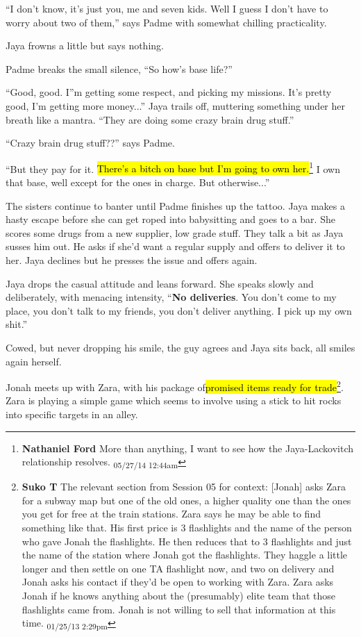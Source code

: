 ``I don't know, it's just you, me and seven kids.  Well I guess I don't have to worry about two of them,'' says Padme with somewhat chilling practicality.

Jaya frowns a little but says nothing.



Padme breaks the small silence, ``So how's base life?''

``Good, good.  I''m getting some respect, and picking my missions.  It's pretty good, I'm getting more money...'' Jaya trails off, muttering something under her breath like a mantra.  ``They are doing some crazy brain drug stuff.''

``Crazy brain drug stuff??'' says Padme.

``But they pay for it.  \hl{There's a bitch on base but I'm going to own her.}\footnote{\textbf{Nathaniel Ford }More than anything, I want to see how the Jaya-Lackovitch relationship resolves. \textsubscript{05/27/14 12:44am}}  I own that base, well except for the ones in charge.  But otherwise...''



The sisters continue to banter until Padme finishes up the tattoo.  Jaya makes a hasty escape before she can get roped into babysitting and goes to a bar.  She scores some drugs from a new supplier, low grade stuff.  They talk a bit as Jaya susses him out.  He asks if she'd want a regular supply and offers to deliver it to her.  Jaya declines but he presses the issue and offers again.

Jaya drops the casual attitude and leans forward.  She speaks slowly and deliberately, with menacing intensity, ``\textbf{No deliveries}. You don't come to my place, you don't talk to my friends, you don't deliver anything.   I pick up my own shit.''

Cowed, but never dropping his smile, the guy agrees and Jaya sits back, all smiles again herself.



Jonah meets up with Zara, with his package of\hl{promised items ready for trade}\footnote{\textbf{Suko T }The relevant section from Session 05 for context: {[}Jonah{]} asks Zara for a subway map but one of the old ones, a higher quality one than the ones you get for free at the train stations.  Zara says he may be able to find something like that.  His first price is 3 flashlights and the name of the person who gave Jonah the flashlights.  He then reduces that to 3 flashlights and just the name of the station where Jonah got the flashlights.  They haggle a little longer and then settle on one TA flashlight now, and two on delivery and Jonah asks his contact if they'd be open to working with Zara.  Zara asks Jonah if he knows anything about the (presumably) elite team that those flashlights came from.  Jonah is not willing to sell that information at this time. \textsubscript{01/25/13 2:29pm}}.  Zara is playing a simple game which seems to involve using a stick to hit rocks into specific targets in an alley.



